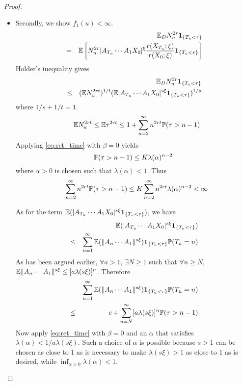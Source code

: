 \documentclass{article}
\begin{document}
\begin{proof}
\begin{enumerate}[(i)]
\begin{itemize}
    \item Secondly, we show $f_1(u) < \infty$.
      \begin{eqnarray*}
        && \E_D N_u^{2r} \1{T_u < \tau} \\
        &=& \E \left[
          N_u^{2r} |A_{T_u} \cdots A_1 X_0|^{\xi}
          \frac{r(X_{T_u}; \xi)}{r(X_0; \xi)}
          \1{T_u < \tau}
        \right]
      \end{eqnarray*}
      H\"older's inequality gives
      \begin{eqnarray*}
        && \E_D N_u^{2r} \1{T_u < \tau} \\
        &\leq& (\E N_u^{2rt})^{1/t}
        (\E |A_{T_u} \cdots A_1 X_0|^{s\xi} \1{T_u < \tau})^{1/s}
      \end{eqnarray*}
      where $1/s + 1/t = 1$.
      \begin{eqnarray*}
        && \E N_u^{2rt} \leq \E \tau^{2rt} \leq 1 + \sum_{n=2}^\infty
        n^{2rt} \P(\tau > n-1)
      \end{eqnarray*}
      Applying \eqref{eq:ret_time} with $\beta=0$ yields
      \[
      \P(\tau > n-1) \leq K \lambda(\alpha)^{n-2}
      \]
      where $\alpha > 0$ is chosen such that $\lambda(\alpha) < 1$. Thus
      \begin{eqnarray*}
        && \sum_{n=2}^\infty n^{2rt} \P(\tau > n-1) \leq K \sum_{n=2}^\infty n^{2rt}
        \lambda(\alpha)^{n-2} < \infty
      \end{eqnarray*}
      
      As for the term $\E(|A_{T_u} \cdots A_1 X_0|^{s\xi} \1{T_u <
        \tau})$, we have
      \begin{eqnarray*}
        && \E(|A_{T_u} \cdots A_1 X_0|^{s\xi} \1{T_u < \tau}) \\
        &\leq& \sum_{n=1}^{\infty} \E(\|A_n \cdots A_1 \|^{s\xi})
        \1{T_u < \tau} \P(T_u = n)
      \end{eqnarray*}
      As has been argued earlier, $\forall a > 1$, $\exists N \geq 1$
      such that $\forall n \geq N$, $\E\|A_n \cdots A_1\|^{s\xi} \leq
      [a \lambda(s\xi)]^{n}$. Therefore
      \begin{eqnarray*}
        && \sum_{n=1}^{\infty} \E(\|A_n \cdots A_1 \|^{s\xi})
        \1{T_u < \tau} \P(T_u = n) \\
        &\leq& c + \sum_{n=N}^\infty [a \lambda(s\xi)]^{n}
        \P(\tau > n-1)
      \end{eqnarray*}
      Now apply \eqref{eq:ret_time} with $\beta = 0$ and an $\alpha$
      that satisfies $\lambda(\alpha) < 1/a\lambda(s\xi)$. Such a choice
      of $\alpha$ is possible because $s > 1$ can be chosen
      as close to 1 as is necessary to make $\lambda(s\xi) > 1$ as close
      to 1 as is desired, while $\inf_{\alpha > 0} \lambda(\alpha) <
      1$.


\end{itemize}
\end{enumerate}
\end{proof}
\end{document}
